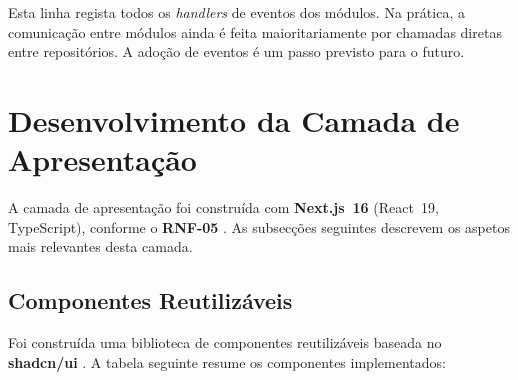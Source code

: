 Esta linha regista todos os \textit{handlers} de eventos dos módulos. Na prática, a comunicação entre módulos ainda é feita maioritariamente por chamadas diretas entre repositórios. A adoção de eventos é um passo previsto para o futuro.


\section{Desenvolvimento da Camada de Apresentação}\label{sec:rel_frontend}

A camada de apresentação foi construída com \textbf{Next.js~16} (React~19, TypeScript), conforme o \textbf{RNF-05} \cite{nextjs2024}. As subsecções seguintes descrevem os aspetos mais relevantes desta camada.

\subsection{Componentes Reutilizáveis}

Foi construída uma biblioteca de componentes reutilizáveis baseada no \textbf{shadcn/ui} \cite{shadcnui2024}. A tabela seguinte resume os componentes implementados:

